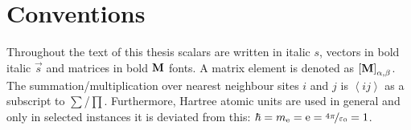 \section*{Conventions}
Throughout the text of this thesis scalars are written in italic \(s\), vectors in bold italic \(\vec{s}\) and matrices in bold \(\textbf{M}\) fonts.
A matrix element is denoted as \(\left[\textbf{M}\right]_{\alpha, \beta}\).
The summation/multiplication over nearest neighbour sites \(i\) and \(j\) is \(\left\langle ij \right\rangle\) as a subscript to \(\sum\)/\(\prod\).
Furthermore, Hartree atomic units are used in general and only in selected instances it is deviated from this: \(\hbar = m_\mathrm{e} = \mathrm{e} = \nicefrac{4\pi}{\varepsilon_0} = 1\).



